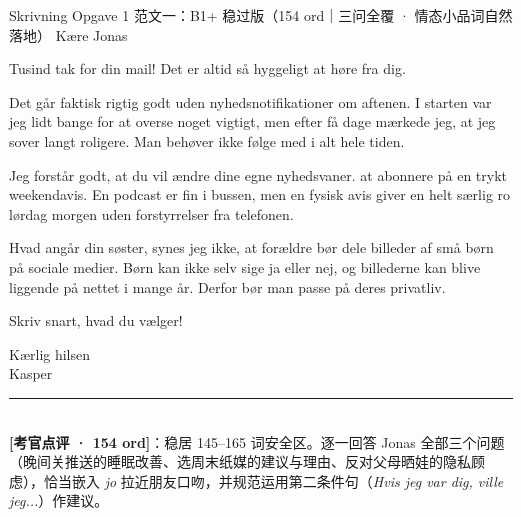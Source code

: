\begin{emailbox}{Skrivning Opgave 1 范文一：B1+ 稳过版（154 ord｜三问全覆 · 情态小品词自然落地）}
Kære Jonas

\vspace{0.25em}
Tusind tak for din mail! Det er  altid så hyggeligt at høre fra dig.

\vspace{0.25em}
Det går faktisk rigtig godt uden nyhedsnotifikationer om aftenen. I starten var jeg lidt bange for at overse noget vigtigt, men efter få dage mærkede jeg, at jeg sover langt roligere. Man behøver  ikke følge med i alt hele tiden.

\vspace{0.25em}
Jeg forstår godt, at du vil ændre dine egne nyhedsvaner.  at abonnere på en trykt weekendavis. En podcast er fin i bussen, men en fysisk avis giver en helt særlig ro lørdag morgen uden forstyrrelser fra telefonen.

\vspace{0.25em}
Hvad angår din søster, synes jeg ikke, at forældre bør dele billeder af små børn på sociale medier. Børn kan  ikke selv sige ja eller nej, og billederne kan blive liggende på nettet i mange år. Derfor bør man passe på deres privatliv.

\vspace{0.25em}
Skriv snart, hvad du vælger!

\vspace{0.25em}
Kærlig hilsen\\
Kasper

\vspace{0.3em}
\rule{\linewidth}{0.4pt}\\[0.2em]
\small\textbf{\color{NCDTeal}[考官点评 · 154 ord]}：稳居 145--165 词安全区。逐一回答 Jonas 全部三个问题（晚间关推送的睡眠改善、选周末纸媒的建议与理由、反对父母晒娃的隐私顾虑），恰当嵌入 \textit{jo} 拉近朋友口吻，并规范运用第二条件句（\textit{Hvis jeg var dig, ville jeg...}）作建议。
\end{emailbox}

